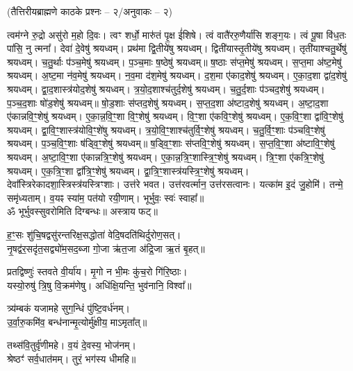 \centerline{\normalsize (तैत्तिरीयब्राह्मणे काठके प्रश्नः – २/अनुवाकः – २)}
 त्वम॑ग्ने रु॒द्रो असु॑रो म॒हो दि॒वः। त्वꣳ शर्धो॒ मारु॑तं पृ॒क्ष ई॑शिषे।
 त्वं वातै॑ररु॒णैर्या॑सि शङ्ग॒यः। त्वं पू॒षा वि॑ध॒तः पा॑सि॒ नु त्मना᳚।
 देवा॑ दे॒वेषु॑ श्रयध्वम्। प्रथ॑मा द्वि॒तीये॑षु श्रयध्वम्।
 द्विती॑यास्तृ॒तीये॑षु श्रयध्वम्। तृती॑याश्चतु॒र्थेषु॑ श्रयध्वम्।
 च॒तु॒र्थाः प॑ञ्च॒मेषु॑ श्रयध्वम्। प॒ञ्च॒माः ष॒ष्ठेषु॑ श्रयध्वम्॥
 ष॒ष्ठाः स॑प्त॒मेषु॑ श्रयध्वम्। स॒प्त॒मा अ॑ष्ट॒मेषु॑ श्रयध्वम्।
 अ॒ष्ट॒मा न॑व॒मेषु॑ श्रयध्वम्। न॒व॒मा द॑श॒मेषु॑ श्रयध्वम्।
 द॒श॒मा ए॑काद॒शेषु॑ श्रयध्वम्। ए॒का॒द॒शा द्वा॑द॒शेषु॑ श्रयध्वम्।
 द्वा॒द॒शास्त्र॑योद॒शेषु॑ श्रयध्वम्। त्र॒यो॒द॒शाश्च॑तुर्द॒शेषु॑ श्रयध्वम्।
 च॒तु॒र्द॒शाः प॑ञ्चद॒शेषु॑ श्रयध्वम्। प॒ञ्च॒द॒शाः षो॑ड॒शेषु॑ श्रयध्वम्॥
 षो॒ड॒शाः स॑प्तद॒शेषु॑ श्रयध्वम्। स॒प्त॒द॒शा अ॑ष्टाद॒शेषु॑ श्रयध्वम्। अ॒ष्टा॒द॒शा ए॑कान्नवि॒ꣳ॒शेषु॑ श्रयध्वम्। ए॒का॒न्न॒वि॒ꣳ॒शा वि॒ꣳ॒शेषु॑ श्रयध्वम्। वि॒ꣳ॒शा ए॑कवि॒ꣳ॒शेषु॑ श्रयध्वम्। ए॒क॒वि॒ꣳ॒शा द्वा॑वि॒ꣳ॒शेषु॑ श्रयध्वम्। द्वा॒वि॒ꣳ॒शास्त्र॑योवि॒ꣳ॒शे॑षु श्रयध्वम्। त्र॒यो॒वि॒ꣳ॒शाश्च॑तुर्वि॒ꣳ॒शेषु॑ श्रयध्वम्। च॒तु॒र्वि॒ꣳ॒शाः प॑ञ्चवि॒ꣳ॒शेषु॑ श्रयध्वम्। प॒ञ्च॒वि॒ꣳ॒शाः ष॑ड्वि॒ꣳ॒शेषु॑ श्रयध्वम्॥
 ष॒ड्वि॒ꣳ॒शाः स॑प्तवि॒ꣳ॒शेषु॑ श्रयध्वम्। स॒प्त॒वि॒ꣳ॒शा अ॑ष्टावि॒ꣳ॒शेषु॑ श्रयध्वम्।
 अ॒ष्टा॒वि॒ꣳ॒शा ए॑कान्नत्रि॒ꣳ॒शेषु॑ श्रयध्वम्। ए॒का॒न्न॒त्रि॒ꣳ॒शास्त्रि॒ꣳ॒शेषु॑ श्रयध्वम्।
 त्रि॒ꣳ॒शा ए॑कत्रि॒ꣳ॒शेषु॑ श्रयध्वम्। ए॒क॒त्रि॒ꣳ॒शा द्वा᳚त्रि॒ꣳ॒शेषु॑ श्रयध्वम्।
 द्वा॒त्रि॒ꣳ॒शास्त्र॑यस्त्रि॒ꣳ॒शेषु॑ श्रयध्वम्। देवा᳚स्त्रिरेकादशा॒स्त्रिस्त्र॑यस्त्रिꣳशाः।
 उत्त॑रे भवत। उत्त॑रवर्त्मान॒ उत्त॑रसत्वानः।
 यत्का॑म इ॒दं जु॒होमि॑। तन्मे॒ समृ॑ध्यताम्।
 व॒यꣴ स्या॑म॒ पत॑यो रयी॒णाम्। भूर्भुवः॒ स्वः॑ स्वाहा᳚॥\\
ॐ भूर्भुवस्सुवरोमिति दिग्बन्धः॥ अस्त्राय फट्॥


ह॒ꣳ॒सः शु॑चि॒षद्वसु॑रन्तरिक्ष॒सद्धोता॑ वेदि॒षदति॑थिर्दुरोण॒सत्।\\
नृ॒षद्व॑र॒सदृ॑त॒सद्व्यो॑म॒सद॒ब्जा गो॒जा ऋ॑त॒जा अ॑द्रि॒जा ऋ॒तं बृ॒हत्॥

प्रतद्विष्णुः॑ स्तवते वी॒र्या॑य। मृ॒गो न भी॒मः कु॑च॒रो गि॑रि॒ष्ठाः।\\
 यस्यो॒रुषु॑ त्रि॒षु वि॒क्रम॑णेषु। अधि॑क्षि॒यन्ति॒ भुव॑नानि॒ विश्वा᳚॥

 त्र्य॑म्बकं यजामहे सुग॒न्धिं पु॑ष्टि॒वर्ध॑नम्।\\
 उ॒र्वा॒रु॒कमि॑व॒ बन्ध॑नान्मृ॒त्योर्मु॑क्षीय॒ माऽमृता᳚त्॥ 

 तथ्स॑वि॒तुर्वृ॑णीमहे। व॒यं दे॒वस्य॒ भोज॑नम्‌।\\
 श्रेष्ठꣳ॑ सर्व॒धात॑मम्‌। तुरं॒ भग॑स्य धीमहि॥ 

